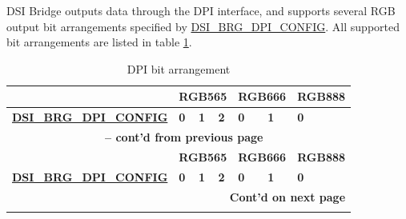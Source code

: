 \documentclass[main\_\_EN.tex]{subfiles}
\begin{document}
DSI Bridge outputs data through the DPI interface, and supports several RGB output bit arrangements specified by \hyperref[fielddesc:DSIBRGDPICONFIG]{DSI\_BRG\_DPI\_CONFIG}. All supported bit arrangements are listed in table \ref{tab:dpi-bit-arrangement}.

\scriptsize
\begin{longtable}[c]{ |p{2.5cm}|p{1cm}|p{1cm}|p{1cm}|p{1cm}|p{1cm}|p{1cm}| }
    \caption{DPI bit arrangement}
    \label{tab:dpi-bit-arrangement}\\\hline

    \rowcolor{lightgray}
    \textbf{} & \multicolumn{3}{|c|}{\textbf{RGB565}} & \multicolumn{2}{|c|}{\textbf{RGB666}} & \textbf{RGB888}  \\\hline
    \rowcolor{lightgray}
    \textbf{\hyperref[fielddesc:DSIBRGDPICONFIG]{DSI\_BRG\_DPI\_CONFIG}} & \textbf{0} & \textbf{1} & \textbf{2} & \textbf{0} & \textbf{1} & \textbf{0}  \\\hline
    \endfirsthead


    \multicolumn{7}{c}{\bfseries \tablename\ \thetable{} -- cont'd from previous page}\\\hline
    \rowcolor{lightgray}
    \textbf{} & \multicolumn{3}{|c|}{\textbf{RGB565}} & \multicolumn{2}{|c|}{\textbf{RGB666}} & \textbf{RGB888}  \\\hline
    \rowcolor{lightgray}
    \textbf{\hyperref[fielddesc:DSIBRGDPICONFIG]{DSI\_BRG\_DPI\_CONFIG}} & \textbf{0} & \textbf{1} & \textbf{2} & \textbf{0} & \textbf{1} & \textbf{0} \\\hline
    \endhead

    \multicolumn{7}{r}{\textbf{Cont'd on next page}} \\
    \endfoot

    \endlastfoot
        

\end{longtable}
\end{document}
